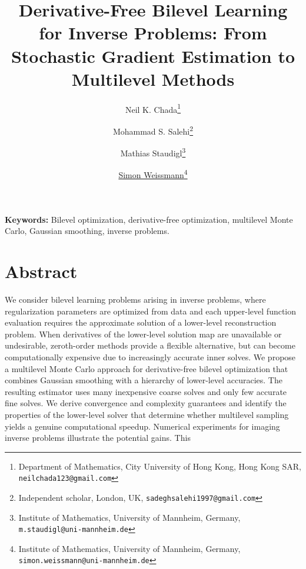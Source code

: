 \documentclass[11pt]{article}
\title{\bfseries Derivative-Free Bilevel Learning for Inverse Problems: From Stochastic Gradient Estimation to Multilevel Methods}
\author{
Neil K. Chada\thanks{Department of Mathematics, City University of Hong Kong, Hong Kong SAR, \texttt{neilchada123@gmail.com}}
\and
Mohammad S. Salehi\thanks{Independent scholar, London, UK, \texttt{sadeghsalehi1997@gmail.com}}
\and 
Mathias Staudigl\thanks{Institute of Mathematics, University of Mannheim, Germany, \texttt{m.staudigl@uni-mannheim.de}}
\and 
\underline{Simon Weissmann}\thanks{Institute of Mathematics, University of Mannheim, Germany, \texttt{simon.weissmann@uni-mannheim.de}}
}
\date{}
\begin{document}
\maketitle

\vspace{-1em}

\noindent
\textbf{Keywords:}
Bilevel optimization, derivative-free optimization, multilevel Monte Carlo, Gaussian smoothing, inverse problems.

\vspace{0.5em}


\vspace{1em}

\section*{Abstract}

We consider bilevel learning problems arising in inverse problems, where regularization parameters are optimized from data and each upper-level function evaluation requires the approximate solution of a lower-level reconstruction problem. When derivatives of the lower-level solution map are unavailable or undesirable, zeroth-order methods provide a flexible alternative, but can become computationally expensive due to increasingly accurate inner solves. We propose a multilevel Monte Carlo approach for derivative-free bilevel optimization that combines Gaussian smoothing with a hierarchy of lower-level accuracies. The resulting estimator uses many inexpensive coarse solves and only few accurate fine solves. We derive convergence and complexity guarantees and identify the properties of the lower-level solver that determine whether multilevel sampling yields a genuine computational speedup. Numerical experiments for imaging inverse problems illustrate the potential gains. This

%
%
%
%
%
%
\end{document}
